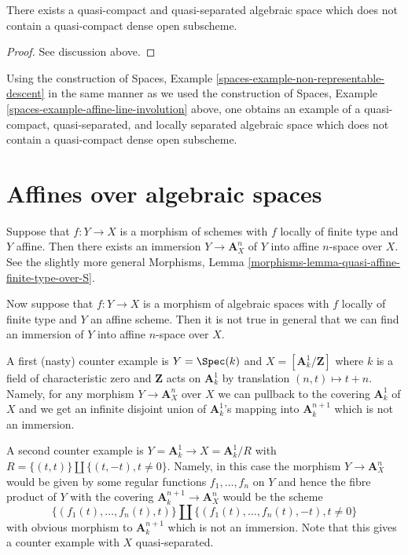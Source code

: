 \begin{lemma}
\label{lemma-nonexistence-qc-dense-open-subscheme}
There exists a quasi-compact and quasi-separated algebraic space
which does not contain a quasi-compact dense open subscheme.
\end{lemma}

\begin{proof}
See discussion above.
\end{proof}

\noindent
Using the construction of 
Spaces, Example \ref{spaces-example-non-representable-descent}
in the same manner as we used the construction of
Spaces, Example \ref{spaces-example-affine-line-involution}
above, one obtains an example of a quasi-compact, quasi-separated, and
locally separated algebraic space which does not contain a quasi-compact
dense open subscheme.


\section{Affines over algebraic spaces}
\label{section-embedding-affines}

\medskip\noindent
Suppose that $f : Y \to X$ is a morphism of schemes with $f$
locally of finite type and $Y$ affine. Then there exists an immersion
$Y \to \mathbf{A}^n_X$ of $Y$ into affine $n$-space over $X$.
See the slightly more general
Morphisms, Lemma \ref{morphisms-lemma-quasi-affine-finite-type-over-S}.

\medskip\noindent
Now suppose that $f : Y \to X$ is a morphism of algebraic spaces with
$f$ locally of finite type and $Y$ an affine scheme. Then it is not
true in general that we can find an immersion of $Y$ into affine
$n$-space over $X$.

\medskip\noindent
A first (nasty) counter example is $Y = \Spec(k)$ and
$X = [\mathbf{A}^1_k/\mathbf{Z}]$ where $k$ is a field of characteristic zero
and $\mathbf{Z}$ acts on $\mathbf{A}^1_k$ by translation $(n, t) \mapsto t + n$.
Namely, for any morphism $Y \to \mathbf{A}^n_X$ over $X$ we can pullback to
the covering $\mathbf{A}^1_k$ of $X$ and we get an infinite disjoint union of
$\mathbf{A}^1_k$'s mapping into $\mathbf{A}^{n + 1}_k$ which is not an
immersion.

\medskip\noindent
A second counter example is $Y = \mathbf{A}^1_k \to X = \mathbf{A}^1_k/R$
with $R = \{(t, t)\} \coprod \{(t, -t), t \not = 0\}$. Namely, in
this case the morphism $Y \to \mathbf{A}^n_X$ would be given by some
regular functions $f_1, \ldots, f_n$ on $Y$ and hence the
fibre product of $Y$ with the covering
$\mathbf{A}^{n + 1}_k \to \mathbf{A}^n_X$
would be the scheme
$$
\{(f_1(t), \ldots, f_n(t), t)\} \coprod
\{(f_1(t), \ldots, f_n(t), -t), t \not = 0\}
$$
with obvious morphism to $\mathbf{A}^{n + 1}_k$ which is not an immersion.
Note that this gives a counter example with $X$ quasi-separated.

